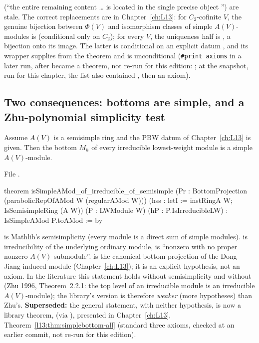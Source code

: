 \begin{warning}
(``the entire remaining content \ldots{} is located in the single precise object '') are
stale. The correct replacements are in Chapter~\ref{ch:L13}: for $C_2$-cofinite $V$, the genuine bijection between
$\Phi(V)$ and isomorphism classes of simple $A(V)$-modules is  (conditional only on
$C_2$); for every $V$, the uniqueness half is , a bijection onto its image. The latter is conditional on an explicit datum , and its
wrapper  supplies  from the theorem  and is unconditional
(\texttt{\#print axioms} in a later run, after  became a theorem, not re-run for this edition:
; at the snapshot, run for this chapter, the list also contained , then an axiom).
\end{warning}

\subsection{Two consequences: bottoms are simple, and a Zhu-polynomial simplicity test}

\begin{theorem}\label{l12:thm:simplebottom}
Assume $A(V)$ is a semisimple ring and the PBW datum  of Chapter~\ref{ch:L13} is given. Then the bottom
$M_h$ of every irreducible lowest-weight module is a simple $A(V)$-module.
\end{theorem}
\noindent File .
\begin{leancode}
theorem isSimpleAMod_of_irreducible_of_semisimple
    (Pr : BottomProjection (parabolicRepOfAMod W (regularAMod W)))
    (hss : letI := instRingA W; IsSemisimpleRing (A W))
    (P : LWModule W) (hP : P.IsIrreducibleLW) : IsSimpleAMod P.toAMod := by
\end{leancode}

\begin{dictionary}
 is Mathlib's semisimplicity (every module is a direct sum of simple modules).
 is irreducibility of the underlying ordinary module,  is ``nonzero
with no proper nonzero $A(V)$-submodule''.  is the canonical-bottom projection of the Dong--Jiang
induced module (Chapter~\ref{ch:L13}); it is an explicit hypothesis, not an axiom. In the literature this
statement holds without semisimplicity and without  (Zhu 1996, Theorem~2.2.1: the top level of an
irreducible module is an irreducible $A(V)$-module); the library's version is therefore \emph{weaker} (more
hypotheses) than Zhu's. \textbf{Superseded:} the general statement, with neither hypothesis, is now a library theorem,
 (via ), presented in
Chapter~\ref{ch:L13}, Theorem~\ref{l13:thm:simplebottom-all} (standard three axioms, checked at an earlier commit, not re-run for this edition).
\end{dictionary}

